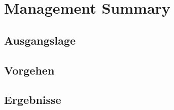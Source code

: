 \section{Management Summary}

\subsection{Ausgangslage}
\subsection{Vorgehen}
\subsection{Ergebnisse}